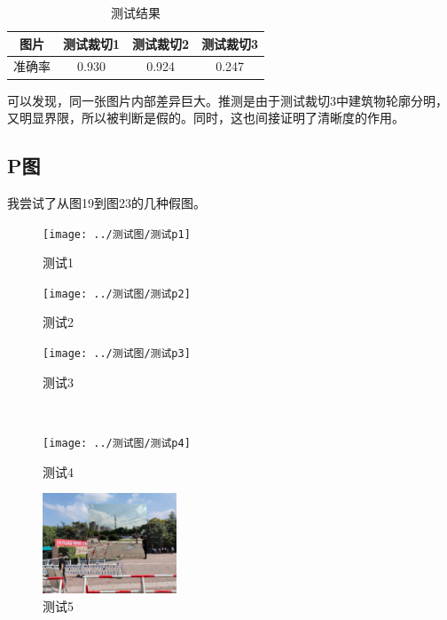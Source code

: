\documentclass[boldfont,linespread=1.35]{ctexart}
\begin{document}
\begin{table} [h]
	\centering
	\caption{测试结果}
	\begin{tabular}
		{cccc}
		\toprule[1pt]
		\rowcolor[gray]{0.9} 图片 &测试裁切1 &测试裁切2 &测试裁切3\\
		\midrule
		准确率   &0.930 &0.924 &0.247\\
		\bottomrule[1pt]
	\end{tabular}
\end{table}

可以发现，同一张图片内部差异巨大。推测是由于测试裁切3中建筑物轮廓分明，又明显界限，所以被判断是假的。同时，这也间接证明了清晰度的作用。

\subsection{P图}
我尝试了从图19到图23的几种假图。
\begin{figure}[h]
	\centering
	\begin{minipage}[t]{0.3\linewidth}
		\centering
		\texttt{[image: ../测试图/测试p1]}
		\color{gray}\caption{测试1}
	\end{minipage}
	\begin{minipage}[t]{0.3\linewidth} %
		\centering
		\texttt{[image: ../测试图/测试p2]}
		\color{gray}\caption{测试2}
	\end{minipage}
	\begin{minipage}[t]{0.3\linewidth} %
		\centering
		\texttt{[image: ../测试图/测试p3]}
		\color{gray}\caption{测试3}
	\end{minipage}\\
	\begin{minipage}[t]{0.3\linewidth}
		\centering
		\vspace{2mm}
		\texttt{[image: ../测试图/测试p4]}
		\color{gray}\caption{测试4}
	\end{minipage}
	\begin{minipage}[t]{0.3\linewidth} %
		\centering
		\vspace{2mm}
		\includegraphics[width=4cm]{../测试图/测试p5}
		\color{gray}\caption{测试5}
	\end{minipage}
\end{figure}
\end{document}
